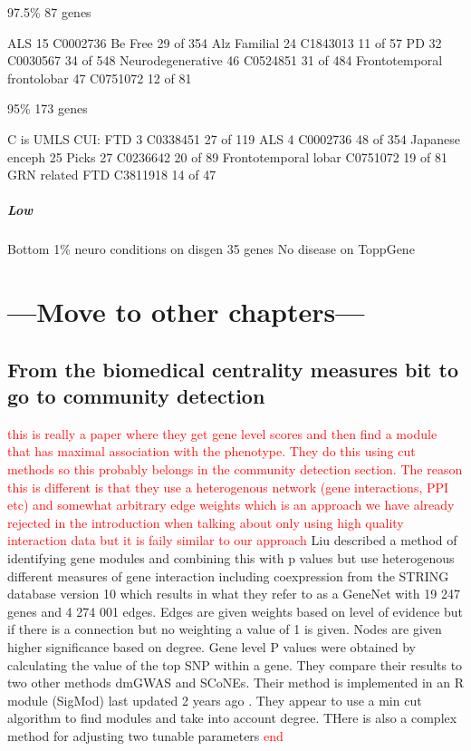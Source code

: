 97.5\%
87 genes

ALS 15 C0002736 Be Free 29 of 354
Alz Familial 24 C1843013 11 of 57
PD 32 C0030567 34 of 548 
Neurodegenerative  46 C0524851 31 of 484
Frontotemporal frontolobar 47 C0751072 12 of 81


95\%
173 genes

C is UMLS CUI: 
FTD 3 C0338451 27 of 119
ALS 4 C0002736 48 of 354
Japanese enceph 25
Picks 27 C0236642 20 of 89
Frontotemporal lobar C0751072 19 of 81
GRN related FTD C3811918 14 of 47


\subparagraph{Low}
Bottom 1\% neuro conditions on disgen 35 genes
No disease on ToppGene
 \section{---Move to other chapters---}
 \subsection{From the biomedical centrality measures bit to go to community detection}
 \textcolor{red}{this is really a paper where they get gene level scores and then find a module that has maximal association with the phenotype. They do this using cut methods so this probably belongs in the community detection section. The reason this is different is that they use a heterogenous network (gene interactions, PPI etc) and somewhat arbitrary edge weights which is an approach we have already rejected in the introduction when talking about only using high quality interaction data but it is faily similar to our approach}
Liu \cite{liu2017sigmod} described a method of identifying gene modules and combining this with p values but use heterogenous different measures of gene interaction including coexpression from the STRING database version 10 which results in what they refer to as a GeneNet  with 19 247 genes and 4 274 001 edges. Edges are given weights based on level of evidence but if there is a connection but no weighting a value of 1 is given. Nodes are given higher significance based on degree.  Gene level P values were obtained by calculating the value of the top SNP within a gene. They compare their results to two other methods dmGWAS and SCoNEs. Their method is implemented in an R module (SigMod) last updated 2 years ago . They appear to use a min cut algorithm to find modules and take into account degree. THere is also a complex method for adjusting two tunable parameters \textcolor{red}{end}

